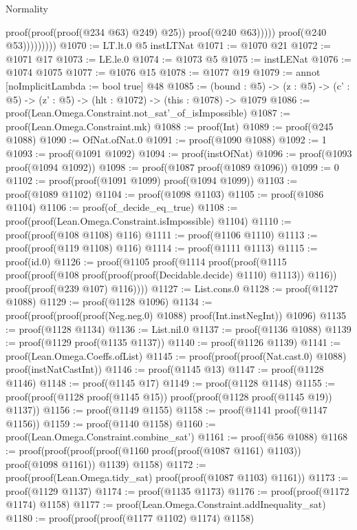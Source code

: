 \begin{lexlean}{Normality}
\begin{coremodule}
                                proof(proof(proof(@234 @63) @249) @25))
                              proof(@240 @63)))))
                    proof(@240 @53)))))))))
@1070 := LT.lt.{0} @5 instLTNat
@1071 := @1070 @21
@1072 := @1071 @17
@1073 := LE.le.{0}
@1074 := @1073 @5
@1075 := instLENat
@1076 := @1074 @1075
@1077 := @1076 @15
@1078 := @1077 @19
@1079 := annot [noImplicitLambda := bool true] @48
@1085 := (bound : @5) ->
  (z : @5) -> (c' : @5) -> (z' : @5) -> (hlt : @1072) -> (this : @1078) -> @1079
@1086 := proof(Lean.Omega.Constraint.not_sat'_of_isImpossible)
@1087 := proof(Lean.Omega.Constraint.mk)
@1088 := proof(Int)
@1089 := proof(@245 @1088)
@1090 := OfNat.ofNat.{0}
@1091 := proof(@1090 @1088)
@1092 := 1
@1093 := proof(@1091 @1092)
@1094 := proof(instOfNat)
@1096 := proof(@1093 proof(@1094 @1092))
@1098 := proof(@1087 proof(@1089 @1096))
@1099 := 0
@1102 := proof(proof(@1091 @1099) proof(@1094 @1099))
@1103 := proof(@1089 @1102)
@1104 := proof(@1098 @1103)
@1105 := proof(@1086 @1104)
@1106 := proof(of_decide_eq_true)
@1108 := proof(proof(Lean.Omega.Constraint.isImpossible) @1104)
@1110 := proof(proof(@108 @1108) @116)
@1111 := proof(@1106 @1110)
@1113 := proof(proof(@119 @1108) @116)
@1114 := proof(@1111 @1113)
@1115 := proof(id.{0})
@1126 := proof(@1105
      proof(@1114
          proof(proof(@1115
                proof(proof(@108 proof(proof(proof(Decidable.decide) @1110) @1113)) @116))
              proof(proof(@239 @107) @116))))
@1127 := List.cons.{0}
@1128 := proof(@1127 @1088)
@1129 := proof(@1128 @1096)
@1134 := proof(proof(proof(proof(Neg.neg.{0}) @1088) proof(Int.instNegInt)) @1096)
@1135 := proof(@1128 @1134)
@1136 := List.nil.{0}
@1137 := proof(@1136 @1088)
@1139 := proof(@1129 proof(@1135 @1137))
@1140 := proof(@1126 @1139)
@1141 := proof(Lean.Omega.Coeffs.ofList)
@1145 := proof(proof(proof(Nat.cast.{0}) @1088) proof(instNatCastInt))
@1146 := proof(@1145 @13)
@1147 := proof(@1128 @1146)
@1148 := proof(@1145 @17)
@1149 := proof(@1128 @1148)
@1155 := proof(proof(@1128 proof(@1145 @15)) proof(proof(@1128 proof(@1145 @19)) @1137))
@1156 := proof(@1149 @1155)
@1158 := proof(@1141 proof(@1147 @1156))
@1159 := proof(@1140 @1158)
@1160 := proof(Lean.Omega.Constraint.combine_sat')
@1161 := proof(@56 @1088)
@1168 := proof(proof(proof(proof(@1160 proof(proof(@1087 @1161) @1103)) proof(@1098 @1161)) @1139)
      @1158)
@1172 := proof(proof(Lean.Omega.tidy_sat) proof(proof(@1087 @1103) @1161))
@1173 := proof(@1129 @1137)
@1174 := proof(@1135 @1173)
@1176 := proof(proof(@1172 @1174) @1158)
@1177 := proof(Lean.Omega.Constraint.addInequality_sat)
@1180 := proof(proof(proof(@1177 @1102) @1174) @1158)

\end{coremodule}
\end{lexlean}
